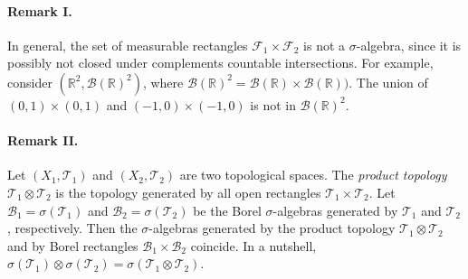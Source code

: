 \documentclass{article}
\numberwithin{equation}{section}
\theoremstyle{plain}
\theoremstyle{definition}
\begin{document}
\paragraph{Remark I.} In general, the set of measurable rectangles $\mathscr{F}_1\times\mathscr{F}_2$ is not a $\sigma$-algebra, since it is possibly not closed under complements countable intersections. For example, consider $(\mathbb{R}^2,\mathscr{B}(\mathbb{R})^2)$, where $\mathscr{B}(\mathbb{R})^2=\mathscr{B}(\mathbb{R})\times\mathscr{B}(\mathbb{R}))$. The union of $(0,1)\times(0,1)$ and $(-1,0)\times (-1,0)$ is not in $\mathscr{B}(\mathbb{R})^2$.

\paragraph{Remark II.} Let $(X_1,\mathscr{T}_1)$ and $(X_2,\mathscr{T}_2)$ are two  topological spaces. The \textit{product topology} $\mathscr{T}_1\otimes\mathscr{T}_2$ is the topology generated by all open rectangles $\mathscr{T}_1\times\mathscr{T}_2$. Let $\mathscr{B}_1=\sigma(\mathscr{T}_1)$ and $\mathscr{B}_2=\sigma(\mathscr{T}_2)$ be the Borel $\sigma$-algebras generated by $\mathscr{T}_1$ and $\mathscr{T}_2$, respectively. Then the $\sigma$-algebras generated by the product topology $\mathscr{T}_1\otimes\mathscr{T}_2$ and by Borel rectangles $\mathscr{B}_1\times\mathscr{B}_2$ coincide. In a nutshell, $\sigma(\mathscr{T}_1)\otimes\sigma(\mathscr{T}_2)=\sigma(\mathscr{T}_1\otimes\mathscr{T}_2)$.
\end{document}
